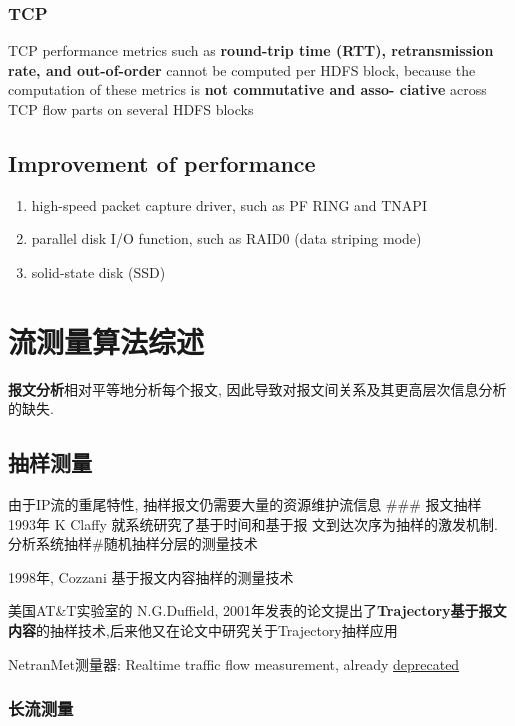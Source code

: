 \documentclass{article}
\begin{document}
\subsubsection{TCP}\label{tcp}
TCP performance metrics such as \textbf{round-trip time (RTT), retransmission rate, and out-of-order} cannot be computed per HDFS block, 
because the computation of these metrics is \textbf{not commutative and asso- ciative} across TCP flow parts on several HDFS blocks

\subsection{Improvement of performance}\label{improvement-of-performance}

\begin{enumerate}
\item high-speed packet capture driver, such as PF RING and TNAPI
\item parallel disk I/O function, such as RAID0 (data striping mode)
\item solid-state disk (SSD)
\end{enumerate}

\section{流测量算法综述}\label{ux6d41ux6d4bux91cfux7b97ux6cd5ux7efcux8ff0}

\textbf{报文分析}相对平等地分析每个报文, 因此导致对报文间关系及其更高层次信息分析的缺失.

\subsection{抽样测量}\label{ux62bdux6837ux6d4bux91cf}

由于IP流的重尾特性, 抽样报文仍需要大量的资源维护流信息 \#\#\# 报文抽样
1993年 K Claffy 就系统研究了基于时间和基于报 文到达次序为抽样的激发机制.
分析系统抽样\#随机抽样分层的测量技术

1998年, Cozzani 基于报文内容抽样的测量技术

美国AT\&T实验室的 N.G.Duffield, 2001年发表的论文提出了\textbf{Trajectory基于报文内容}的抽样技术,后来他又在论文中研究关于Trajectory抽样应用

NetranMet测量器: Realtime traffic flow measurement, already
\href{http://www.caida.org/tools/}{deprecated}

\subsubsection{长流测量}\label{ux957fux6d41ux6d4bux91cf}
\end{document}

